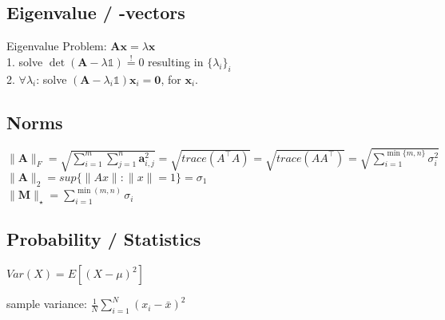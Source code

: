 \subsection*{Eigenvalue / -vectors}
Eigenvalue Problem: $\mathbf{Ax} = \lambda \mathbf{x}$\\
1. solve $\operatorname{det}(\mathbf{A} - \lambda \mathbb{1}) \overset{!}{=} 0$ resulting in $\{\lambda_i\}_i$\\
2. $\forall \lambda_i$:
solve $(\mathbf{A} - \lambda_i \mathbb{1}) \mathbf{x}_i = \mathbf{0}$, for $\mathbf{x}_i$.

\subsection*{Norms}
$\|\mathbf{A}\|_F =\allowbreak \sqrt{\sum_{i=1}^{m} \sum_{j=1}^{n}\mathbf{a}_{i,j}^2} = \sqrt{trace(A^\top A)} = \sqrt{trace(AA^\top)} =\allowbreak \sqrt{\sum_{i=1}^{\min\{m, n\}} \sigma_i^2}$\\
$\|\mathbf{A}\|_2 = sup\{\|Ax\|: \|x\|=1\} = \sigma_1$ \\
$\|\mathbf{M}\|_\star = \sum_{i=1}^{\min(m, n)} \sigma_i$

\subsection*{Probability / Statistics}
\begin{inparaitem}
	\item $Var(X)=E[(X-\mu)^2]$
	\item sample variance: $\frac{1}{N}\sum_{i=1}^{N}(x_i-\bar{x})^2$
\end{inparaitem}